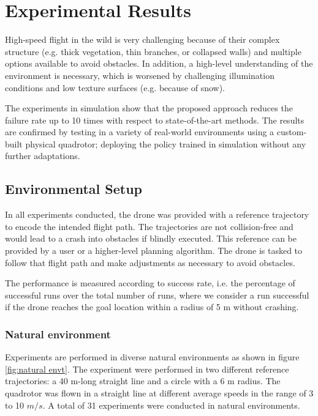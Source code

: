 \chapter{Experimental Results}

High-speed flight in the wild is very challenging because of their complex structure (e.g. thick vegetation, thin branches, or collapsed walls) and multiple options available to avoid obstacles. In addition, a high-level understanding of the environment is necessary, which is worsened by challenging illumination conditions and low texture surfaces (e.g. because of snow). 

The experiments in simulation show that the proposed approach reduces the failure rate up to 10 times with respect to state-of-the-art methods. The results are confirmed by testing in a variety of real-world environments using a custom-built physical quadrotor; deploying the policy trained in simulation without any further adaptations. 

\section{Environmental Setup}

In all experiments conducted, the drone was provided with a reference trajectory to encode the intended
flight path. The trajectories are not collision-free and would lead to a crash into obstacles if blindly executed. This reference can be provided by a user or a higher-level planning algorithm. The drone is tasked to follow that flight path and make adjustments as necessary to avoid obstacles. 

The performance is measured according to success rate, i.e. the percentage of successful runs over the total number of runs, where we consider
a run successful if the drone reaches the goal location within a radius
of 5 m without crashing. 

\subsection{Natural environment}
Experiments are performed in diverse natural environments as shown in figure \ref{fig:natural envt}. The experiment were performed in two different reference trajectories:
a 40 m-long straight line and a circle with a 6 m radius. The quadrotor was flown in a straight line at
different average speeds in the range of 3 to 10 $m/s$. A total of 31 experiments were conducted in natural environments.

